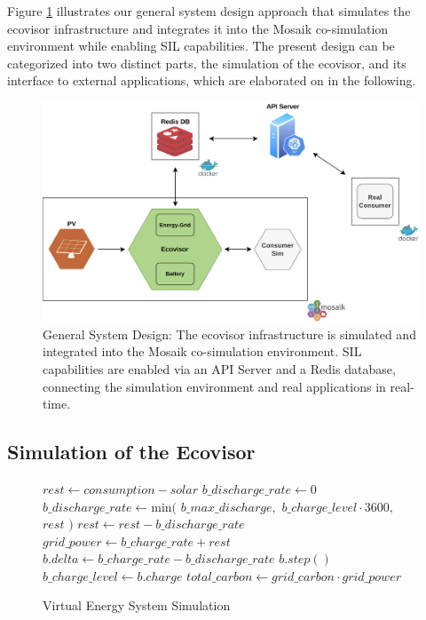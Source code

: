 
Figure \ref{fig:system_design} illustrates our general system design approach
that simulates the ecovisor infrastructure and integrates it into the Mosaik
co-simulation environment while enabling SIL capabilities. The present design
can be categorized into two distinct parts, the simulation of the ecovisor, and
its interface to external applications, which are elaborated on in the
following.

\begin{figure}
    \centering
    \includegraphics[width=\linewidth]{figures/system_design}
    \caption{
        General System Design: The ecovisor infrastructure is simulated and
        integrated into the Mosaik co-simulation environment. SIL capabilities
        are enabled via an API Server and a Redis database, connecting the
        simulation environment and real applications in real-time.
    }
    \label{fig:system_design}
\end{figure}

\subsection{Simulation of the Ecovisor}

\begin{figure}
    \removelatexerror
    \begin{algorithm}[H]
        \caption{Virtual Energy System Simulation}
        \label{alg:virtual_energy_system_simulation}
        $rest \gets consumption - solar$\;
         {
            $b\_discharge\_rate \gets 0$\;
        }{
            $b\_discharge\_rate \gets \text{min}($\;
            \Indp
                $b\_max\_discharge,$\;
                $b\_charge\_level \cdot 3600,$\;
                $rest$\;
            \Indm
            $)$\;
            $rest \gets rest - b\_discharge\_rate$\;
        }
        $grid\_power \gets b\_charge\_rate + rest$\;
        $b.delta \gets b\_charge\_rate - b\_discharge\_rate$\;
        $b.step()$\;
        $b\_charge\_level \gets b.charge$\;
        $total\_carbon \gets grid\_carbon \cdot grid\_power$\;
        \vspace{3mm}
    \end{algorithm}
\end{figure}

